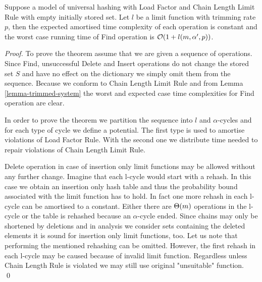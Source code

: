 \begin{theorem}
\label{theorem-amortised-expected-time}
Suppose a model of universal hashing with Load Factor and Chain Length Limit Rule with empty initially stored set. Let $l$ be a limit function with trimming rate $p$, then the expected amortised time complexity of each operation is constant and the worst case running time of Find operation is $\mathcal{O}(1 + l(m, \alpha', p))$.
\end{theorem}
\begin{proof}
To prove the theorem assume that we are given a sequence of operations. Since Find, unsuccessful Delete and Insert operations do not change the stored set $S$ and have no effect on the dictionary we simply omit them from the sequence. Because we conform to Chain Length Limit Rule and from Lemma \ref{lemma-trimmed-system} the worst and expected case time complexities for Find operation are clear.

In order to prove the theorem we partition the sequence into $l$ and $\alpha$-cycles and for each type of cycle we define a potential. The first type is used to amortise violations of Load Factor Rule. With the second one we distribute time needed to repair violations of Chain Length Limit Rule.

Delete operation in case of insertion only limit functions may be allowed without any further change. Imagine that each l-cycle would start with a rehash. In this case we obtain an insertion only hash table and thus the probability bound associated with the limit function has to hold. In fact one more rehash in each l-cycle can be amortised to a constant. Either there are $\mathrm{\Theta}(m)$ operations in the l-cycle or the table is rehashed because an $\alpha$-cycle ended. Since chains may only be shortened by deletions and in analysis we consider sets containing the deleted elements it is sound for insertion only limit functions, too. Let us note that performing the mentioned rehashing can be omitted. However, the first rehash in each l-cycle may be caused because of invalid limit function. Regardless unless Chain Length Rule is violated we may still use original "unsuitable" function.
\qed
\end{proof}